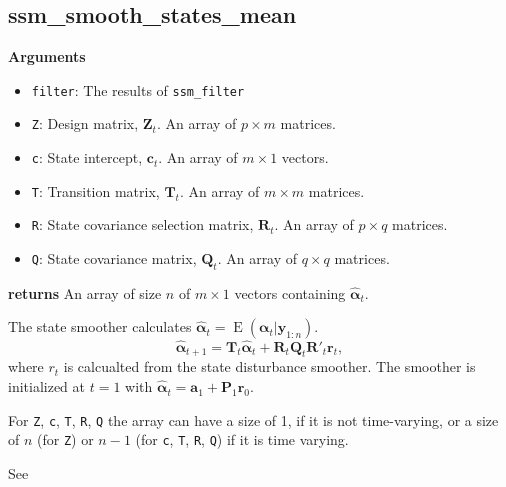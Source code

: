 \documentclass[]{book}
\providecommand{\tightlist}{%
  \setlength{\itemsep}{0pt}\setlength{\parskip}{0pt}}
\DeclareMathOperator{\E}{E}
\newcommand{\mat}[1]{\boldsymbol{#1}}
\renewcommand{\vec}[1]{\boldsymbol{#1}}
\begin{document}
\subsection{ssm\_smooth\_states\_mean}\label{ssm_smooth_states_mean}

\textbf{Arguments}

\begin{itemize}
\tightlist
\item
  \texttt{filter}: The results of \texttt{ssm\_filter}
\item
  \texttt{Z}: Design matrix, \(\mat{Z}_t\). An array of \(p \times m\)
  matrices.
\item
  \texttt{c}: State intercept, \(\vec{c}_t\). An array of \(m \times 1\)
  vectors.
\item
  \texttt{T}: Transition matrix, \(\mat{T}_t\). An array of
  \(m \times m\) matrices.
\item
  \texttt{R}: State covariance selection matrix, \(\mat{R} _t\). An
  array of \(p \times q\) matrices.
\item
  \texttt{Q}: State covariance matrix, \(\mat{Q}_t\). An array of
  \(q \times q\) matrices.
\end{itemize}

\textbf{returns} An array of size \(n\) of \(m \times 1\) vectors
containing \(\hat{\vec{\alpha}}_t\).

The state smoother calculates
\(\hat{\vec{\alpha}}_t = \E(\vec{\alpha}_t | \vec{y}_{1:n})\). \[
\hat{\vec{\alpha}}_{t + 1} = \mat{T}_t \hat{\vec{\alpha}}_{t} + \mat{R}_t \mat{Q}_t \mat{R}'_t \vec{r}_t ,
\] where \(r_t\) is calcualted from the state disturbance smoother. The
smoother is initialized at \(t = 1\) with
\(\hat{\vec{\alpha}}_t = \vec{a}_1 + \mat{P}_1 \vec{r}_0\).

For \texttt{Z}, \texttt{c}, \texttt{T}, \texttt{R}, \texttt{Q} the array
can have a size of 1, if it is not time-varying, or a size of \(n\) (for
\texttt{Z}) or \(n - 1\) (for \texttt{c}, \texttt{T}, \texttt{R},
\texttt{Q}) if it is time varying.

See \autocite[Sec 4.5.3 (eq 4.69)]{DurbinKoopman2012}
\end{document}
